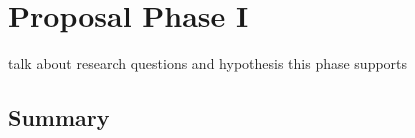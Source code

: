 \section{Proposal Phase I}\label{proposal:p1}
talk about research questions and hypothesis this phase supports

\subsection{Summary}
